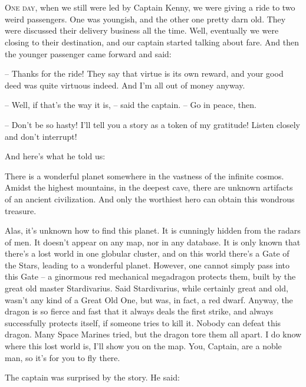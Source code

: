 \documentclass[ebook,oneside,final,openright]{memoir}
\begin{document}
\chapter{}
\par
\lettrine{O}{ne day,} when we still were led by Captain Kenny, we were giving a ride to two weird passengers. One was youngish, and the other one pretty darn old. They were discussed their delivery business all the time. Well, eventually we were closing to their destination, and our captain started talking about fare. And then the younger passenger came forward and said: \par
\par
– Thanks for the ride! They say that virtue is its own reward, and your good deed was quite virtuous indeed. And I’m all out of money anyway.\par
– Well, if that’s the way it is, – said the captain. – Go in peace, then. \par
– Don’t be so hasty! I’ll tell you a story as a token of my gratitude! Listen closely and don’t interrupt! \par
 And here’s what he told us:\par
\par
 There is a wonderful planet somewhere in the vastness of the infinite cosmos. Amidst the highest mountains, in the deepest cave, there are unknown artifacts of an ancient civilization. And only the worthiest hero can obtain this wondrous treasure. \par
Alas, it’s unknown how to find this planet. It is cunningly hidden from the radars of men. It doesn’t appear on any map, nor in any database. It is only known that there’s a lost world in one globular cluster, and on this world there’s a Gate of the Stars, leading to a wonderful planet. However, one cannot simply pass into this Gate – a ginormous red mechanical megadragon protects them, built by the great old master Stardivarius. Said Stardivarius, while certainly great and old, wasn’t any kind of a Great Old One, but was, in fact, a red dwarf. Anyway, the dragon is so fierce and fast that it always deals the first strike, and always successfully protects itself, if someone tries to kill it. Nobody can defeat this dragon. Many Space Marines tried, but the dragon tore them all apart. I do know where this lost world is, I’ll show you on the map. You, Captain, are a noble man, so it’s for you to fly there.\par
\par
The captain was surprised by the story. He said:\par
\end{document}
